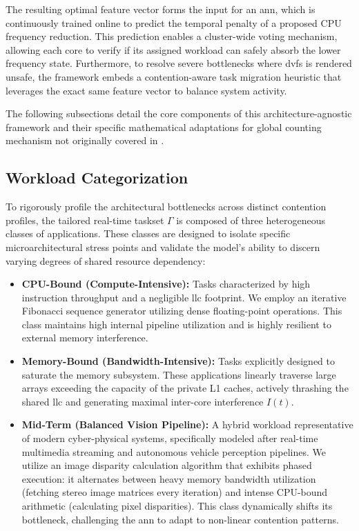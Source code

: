 \documentclass[conference]{IEEEtran}
\begin{document}
The resulting optimal feature vector forms the input for an \gls{ann}, which is continuously trained online to predict the temporal penalty of a proposed CPU frequency reduction. This prediction enables a cluster-wide voting mechanism, allowing each core to verify if its assigned workload can safely absorb the lower frequency state. Furthermore, to resolve severe bottlenecks where \gls{dvfs} is rendered unsafe, the framework embeds a contention-aware task migration heuristic that leverages the exact same feature vector to balance system activity.

The following subsections detail the core components of this architecture-agnostic framework and their specific mathematical adaptations for global counting mechanism not originally covered in \cite{hoffmann2021online}.

\subsection{Workload Categorization}
To rigorously profile the architectural bottlenecks across distinct contention profiles, the tailored real-time taskset $\Gamma$ is composed of three heterogeneous classes of applications. These classes are designed to isolate specific microarchitectural stress points and validate the model's ability to discern varying degrees of shared resource dependency:

\begin{itemize}
    \item \textbf{CPU-Bound (Compute-Intensive):} Tasks characterized by high instruction throughput and a negligible \gls{llc} footprint. We employ an iterative Fibonacci sequence generator utilizing dense floating-point operations. This class maintains high internal pipeline utilization and is highly resilient to external memory interference.
    \item \textbf{Memory-Bound (Bandwidth-Intensive):} Tasks explicitly designed to saturate the memory subsystem. These applications linearly traverse large arrays exceeding the capacity of the private L1 caches, actively thrashing the shared \gls{llc} and generating maximal inter-core interference $I(t)$.
    \item \textbf{Mid-Term (Balanced Vision Pipeline):} A hybrid workload representative of modern cyber-physical systems, specifically modeled after real-time multimedia streaming and autonomous vehicle perception pipelines. We utilize an image disparity calculation algorithm that exhibits phased execution: it alternates between heavy memory bandwidth utilization (fetching stereo image matrices every iteration) and intense CPU-bound arithmetic (calculating pixel disparities). This class dynamically shifts its bottleneck, challenging the \gls{ann} to adapt to non-linear contention patterns.
\end{itemize}
\end{document}
